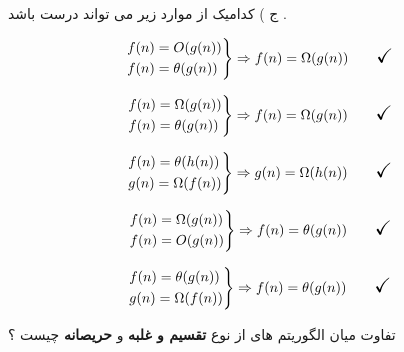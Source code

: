 \documentclass[12pt]{article}
\begin{document}
\vspace{30pt}



\noindent
ج ) کدامیک از موارد زیر می تواند درست باشد .

\begin{align*}
\begin{rcases}
f(n) = O(g(n)) \\
f(n) = \theta(g(n))
\end{rcases} \Rightarrow
f(n) = \Omega(g(n)) \qquad {\Large \checkmark}
\end{align*}


\begin{align*}
\begin{rcases}
f(n) = \Omega(g(n)) \\
f(n) = \theta(g(n))
\end{rcases} \Rightarrow
f(n) = \Omega(g(n)) \qquad {\Large \checkmark}
\end{align*}




\begin{align*}
\begin{rcases}
f(n) = \theta(h(n)) \\
g(n) = \Omega(f(n))
\end{rcases} \Rightarrow
g(n) = \Omega(h(n)) \qquad {\Large \checkmark}
\end{align*}




\begin{align*}
\begin{rcases}
f(n) = \Omega(g(n)) \\
f(n) = O(g(n))
\end{rcases} \Rightarrow
f(n) = \theta(g(n)) \qquad {\Large \checkmark}
\end{align*}







\begin{align*}
\begin{rcases}
f(n) = \theta(g(n)) \\
g(n) = \Omega(f(n))
\end{rcases} \Rightarrow
f(n) = \theta(g(n)) \qquad {\Large \checkmark}
\end{align*}



\newpage



\noindent
تفاوت میان الگوریتم های از نوع 
\textbf{تقسیم و غلبه}
 و
\textbf{حریصانه}
 چیست ؟
\end{document}
